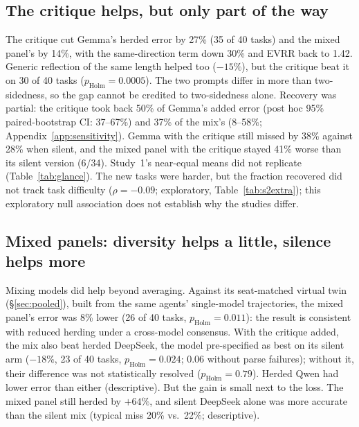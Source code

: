 \documentclass[10pt]{article}
\theoremstyle{manuscript}\newtheorem{proposition}{Proposition}
\newcommand{\pH}{p_{\text{Holm}}}
\begin{document}
\subsection{The critique helps, but only part of the way}\label{sec:reflect}
The critique cut Gemma's herded error by 27\% (35 of 40 tasks) and the mixed panel's by 14\%, with the same-direction term down 30\% and EVRR back to 1.42. Generic reflection of the same length helped too ($-15\%$), but the critique beat it on 30 of 40 tasks ($\pH=0.0005$). The two prompts differ in more than two-sidedness, so the gap cannot be credited to two-sidedness alone. Recovery was partial: the critique took back 50\% of Gemma's added error (post hoc 95\% paired-bootstrap CI: 37--67\%) and 37\% of the mix's (8--58\%; Appendix~\ref{app:sensitivity}). Gemma with the critique still missed by 38\% against 28\% when silent, and the mixed panel with the critique stayed 41\% worse than its silent version (6/34). Study~1's near-equal means did not replicate (Table~\ref{tab:glance}). The new tasks were harder, but the fraction recovered did not track task difficulty ($\rho=-0.09$; exploratory, Table~\ref{tab:s2extra}); this exploratory null association does not establish why the studies differ.

\subsection{Mixed panels: diversity helps a little, silence helps more}\label{sec:mix}
Mixing models did help beyond averaging. Against its seat-matched virtual twin (\S\ref{sec:pooled}), built from the same agents' single-model trajectories, the mixed panel's error was 8\% lower (26 of 40 tasks, $\pH=0.011$): the result is consistent with reduced herding under a cross-model consensus. With the critique added, the mix also beat herded DeepSeek, the model pre-specified as best on its silent arm ($-18\%$, 23 of 40 tasks, $\pH=0.024$; 0.06 without parse failures); without it, their difference was not statistically resolved ($\pH=0.79$). Herded Qwen had lower error than either (descriptive). But the gain is small next to the loss. The mixed panel still herded by $+64\%$, and silent DeepSeek alone was more accurate than the silent mix (typical miss 20\% vs.\ 22\%; descriptive).
\end{document}
